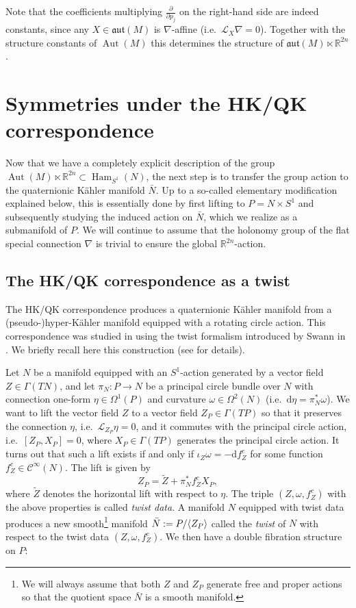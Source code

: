 \documentclass{article}
\theoremstyle{definition}
\DeclareMathOperator{\Aut}{Aut}
\DeclareMathOperator{\Ham}{Ham}
\newcommand{\R}{\mathbb{R}}
\newcommand{\calC}{\mathcal{C}}
\newcommand{\calL}{\mathcal{L}}
\newcommand{\aut}{\mathfrak{aut}}
\newcommand{\pd}[2]{\frac{\partial #1}{\partial #2}}
\renewcommand{\d}{\mathrm{d}}
\DeclarePairedDelimiter{\escal}{\langle}{\rangle}
\begin{document}
	Note that the coefficients multiplying $\pd{}{p_j}$ on the right-hand side are indeed constants, since any $X\in\aut(M)$ is $\nabla$-affine (i.e.\ $\calL_X\nabla=0$). Together with the structure constants of $\Aut(M)$ this determines the structure of $\aut(M)\ltimes\R^{2n}$.
	
	\section{Symmetries under the HK/QK correspondence}
	
	Now that we have a completely explicit description of the group $\Aut(M)\ltimes\R^{2n}\subset\Ham_{S^1}(N)$, the next step is to transfer the group action to the quaternionic K\"ahler manifold $\bar{N}$. Up to a so-called elementary modification explained below, this is essentially done by first lifting to $P=N\times S^1$ and subsequently studying the induced action on $\bar{N}$, which we realize as a submanifold of $P$. We will continue to assume that the holonomy group of the flat special connection $\nabla$ is trivial to ensure the global $\R^{2n}$-action.

    \subsection{The HK/QK correspondence as a twist}
    
    The HK/QK correspondence \cite{Hay08,ACM13} produces a quaternionic K\"ahler manifold from a (pseudo-)hyper-K\"ahler manifold equipped with a rotating circle action. This correspondence was studied in \cite{MS15} using the twist formalism introduced by Swann in \cite{Swa10}. We briefly recall here this construction (see \cite{Swa10} for details).\medskip

    Let $N$ be a manifold equipped with an $S^1$-action generated by a vector field $Z\in\Gamma(TN)$, and let $\pi_N:P\longrightarrow N$ be a principal circle bundle over $N$ with connection one-form $\eta\in\Omega^1(P)$ and curvature $\omega\in\Omega^2(N)$ (i.e.\ $\d\eta=\pi_N^*\omega$). We want to lift the vector field $Z$ to a vector field $Z_P\in\Gamma(TP)$ so that it preserves the connection $\eta$, i.e.\ $\calL_{Z_P}\eta=0$, and it commutes with the principal circle action, i.e.\ $[Z_P,X_P]=0$, where $X_P\in\Gamma(TP)$ generates the principal circle action. It turns out that such a lift exists if and only if $\iota_Z\omega=-\d f_Z^c$ for some function $f_Z^c\in\calC^\infty(N)$. The lift is given by $$Z_P=\tilde{Z}+\pi_N^*f_Z^cX_P,$$ where $\tilde{Z}$ denotes the horizontal lift with respect to $\eta$. The triple $(Z,\omega,f_Z^c)$ with the above properties is called \emph{twist data}. A manifold $N$ equipped with twist data produces a new smooth\footnote{We will always assume that both $Z$ and $Z_P$ generate free and proper actions so that the quotient space $\bar N$ is a smooth manifold.} manifold $\bar N:=P/\escal{Z_P}$ called the \emph{twist} of $N$ with respect to the twist data $(Z,\omega,f_Z^c)$. We then have a double fibration structure on $P$:
    
\end{document}
